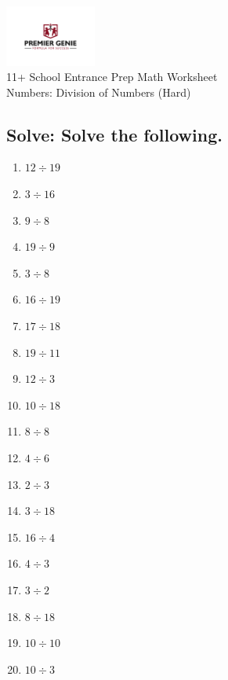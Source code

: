 \documentclass{article}
\begin{document}
\begin{center}
\includegraphics[width=3cm]{PREMGENIEJPG.jpg}\\
{\Large 11+ School Entrance Prep Math Worksheet}\\
{\Medium Numbers: Division of Numbers (Hard)}\\

\end{center}

\subsection*{Solve: Solve the following.}

\begin{enumerate}
\item $\displaystyle {12}\div{19} $ \ 
\item $\displaystyle {3}\div{16} $ \ 
\item $\displaystyle {9}\div{8} $ \ 
\item $\displaystyle {19}\div{9} $ \ 
\item $\displaystyle {3}\div{8} $ \ 
\item $\displaystyle {16}\div{19} $ \ 
\item $\displaystyle {17}\div{18} $ \ 
\item $\displaystyle {19}\div{11} $ \ 
\item $\displaystyle {12}\div{3} $ \ 
\item $\displaystyle {10}\div{18} $ \ 
\item $\displaystyle {8}\div{8} $ \ 
\item $\displaystyle {4}\div{6} $ \ 
\item $\displaystyle {2}\div{3} $ \ 
\item $\displaystyle {3}\div{18} $ \ 
\item $\displaystyle {16}\div{4} $ \ 
\item $\displaystyle {4}\div{3} $ \ 
\item $\displaystyle {3}\div{2} $ \ 
\item $\displaystyle {8}\div{18} $ \ 
\item $\displaystyle {10}\div{10} $ \ 
\item $\displaystyle {10}\div{3} $ \ 


\end{enumerate}
\end{document}
